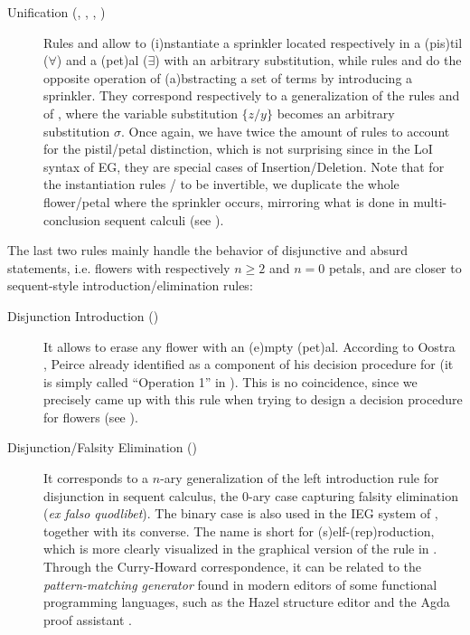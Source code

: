 \begin{description}
  \item[Unification (, , , )]
    Rules  and  allow to \textsf{(i)}nstantiate a sprinkler
    located respectively in a \textsf{(pis)}til ($\forall$) and a
    \textsf{(pet)}al ($\exists$) with an arbitrary substitution, while rules
     and  do the opposite operation of
    \textsf{(a)}bstracting a set of terms by introducing a sprinkler. They
    correspond respectively to a generalization of the rules  and
     of , where the variable substitution $\{z/y\}$
    becomes an arbitrary substitution $\sigma$. Once again, we have twice the
    amount of rules to account for the pistil/petal distinction, which is not
    surprising since in the LoI syntax of EG, they are special cases of
    Insertion/Deletion. Note that for the instantiation rules
    / to be invertible, we duplicate the whole flower/petal
    where the sprinkler occurs, mirroring what is done in multi-conclusion
    sequent calculi (see ).
\end{description}

The last two rules mainly handle the behavior of disjunctive and absurd
statements, i.e. flowers with respectively $n \geq 2$ and $n = 0$ petals, and
are closer to sequent-style introduction/elimination rules:

\begin{description}
  \item[Disjunction Introduction ()]
    It allows to erase any flower with an \textsf{(e)}mpty \textsf{(pet)}al.
    According to Oostra \cite[p.~109]{oostra_advances_2022}, Peirce already
    identified  as a component of his decision procedure for
     (it is simply called ``Operation 1'' in
    \cite{oostra_advances_2022}). This is no coincidence, since we precisely
    came up with this rule when trying to design a decision procedure for
    flowers (see ).

  \item[Disjunction/Falsity Elimination ()]
    It corresponds to a $n$-ary generalization of the left introduction rule for
    disjunction in sequent calculus, the $0$-ary case capturing falsity
    elimination (\textit{ex falso quodlibet}). The binary case is also used in
    the IEG system of \cite{minghui_graphical_2019}, together with its converse.
    The name  is short for \textsf{(s)}elf-\textsf{(rep)}roduction,
    which is more clearly visualized in the graphical version of the rule in
    . Through the Curry-Howard correspondence, it can
    be related to the \emph{pattern-matching generator} found in modern editors
    of some functional programming languages, such as the Hazel structure editor
    and the Agda proof assistant .
\end{description}

